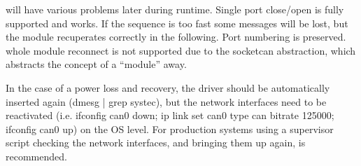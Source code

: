 \documentclass[a4paper,10pt,english]{sphinxmanual}
\begin{document}
\sphinxAtStartPar
will have various problems later during runtime.
\sphinxhyphen{} Single port close/open is fully supported and works. If the sequence is too fast some messages will be lost, but the
module recuperates correctly in the following. Port numbering is preserved.
\sphinxhyphen{} whole module reconnect is not supported due to the socketcan abstraction, which abstracts the concept of a “module” away.

\sphinxAtStartPar
In the case of a power loss and recovery, the driver should be automatically inserted again (dmesg | grep systec), but the network
interfaces need to be re\sphinxhyphen{}activated (i.e. ifconfig can0 down; ip link set can0 type can bitrate 125000; ifconfig can0 up) on the OS level.
For production systems using a supervisor script checking the network interfaces, and bringing them up again, is recommended.
\end{document}
